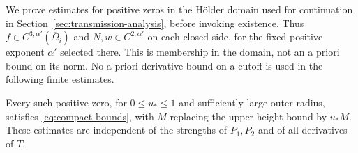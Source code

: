 We prove estimates for positive zeros in the H\"older domain used for
continuation in Section~\ref{sec:transmission-analysis}, before invoking
existence.  Thus $f\in C^{3,\alpha'}(\overline\Omega_i)$ and
$N,w\in C^{2,\alpha'}$ on each closed side, for the fixed positive
exponent $\alpha'$ selected there.  This is membership in the domain,
not an a priori bound on its norm.  No a priori derivative bound on a
cutoff is used in the following finite estimates.

\begin{lemma}\label{lem:compact-lapse}
Every such positive zero, for $0\le u_*\le1$ and sufficiently large
outer radius, satisfies \eqref{eq:compact-bounds}, with $M$ replacing
the upper height bound by $u_*M$. These estimates are independent of
the strengths of $P_1,P_2$ and of all derivatives of $T$.
\end{lemma}

